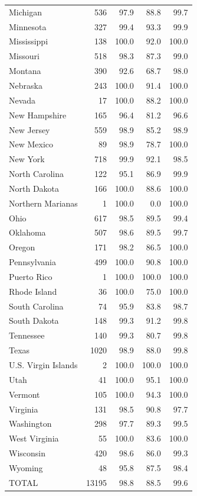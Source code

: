 \begin{longtable}[t]{lrrrr}
Michigan & 536 & 97.9 & 88.8 & 99.7\\
Minnesota & 327 & 99.4 & 93.3 & 99.9\\
\addlinespace
Mississippi & 138 & 100.0 & 92.0 & 100.0\\
Missouri & 518 & 98.3 & 87.3 & 99.0\\
Montana & 390 & 92.6 & 68.7 & 98.0\\
Nebraska & 243 & 100.0 & 91.4 & 100.0\\
Nevada & 17 & 100.0 & 88.2 & 100.0\\
\addlinespace
New Hampshire & 165 & 96.4 & 81.2 & 96.6\\
New Jersey & 559 & 98.9 & 85.2 & 98.9\\
New Mexico & 89 & 98.9 & 78.7 & 100.0\\
New York & 718 & 99.9 & 92.1 & 98.5\\
North Carolina & 122 & 95.1 & 86.9 & 99.9\\
\addlinespace
North Dakota & 166 & 100.0 & 88.6 & 100.0\\
Northern Marianas & 1 & 100.0 & 0.0 & 100.0\\
Ohio & 617 & 98.5 & 89.5 & 99.4\\
Oklahoma & 507 & 98.6 & 89.5 & 99.7\\
Oregon & 171 & 98.2 & 86.5 & 100.0\\
\addlinespace
Pennsylvania & 499 & 100.0 & 90.8 & 100.0\\
Puerto Rico & 1 & 100.0 & 100.0 & 100.0\\
Rhode Island & 36 & 100.0 & 75.0 & 100.0\\
South Carolina & 74 & 95.9 & 83.8 & 98.7\\
South Dakota & 148 & 99.3 & 91.2 & 99.8\\
\addlinespace
Tennessee & 140 & 99.3 & 80.7 & 99.8\\
Texas & 1020 & 98.9 & 88.0 & 99.8\\
U.S. Virgin Islands & 2 & 100.0 & 100.0 & 100.0\\
Utah & 41 & 100.0 & 95.1 & 100.0\\
Vermont & 105 & 100.0 & 94.3 & 100.0\\
\addlinespace
Virginia & 131 & 98.5 & 90.8 & 97.7\\
Washington & 298 & 97.7 & 89.3 & 99.5\\
West Virginia & 55 & 100.0 & 83.6 & 100.0\\
Wisconsin & 420 & 98.6 & 86.0 & 99.3\\
Wyoming & 48 & 95.8 & 87.5 & 98.4\\
\addlinespace
TOTAL & 13195 & 98.8 & 88.5 & 99.6\\
\end{longtable}
\endgroup{}
